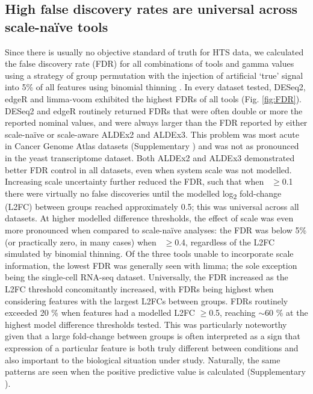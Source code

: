 \documentclass[10pt,letterpaper]{article}
\begin{document}
\subsection*{High false discovery rates are universal across scale-na\"ive tools}
Since there is usually no objective standard of truth for HTS data, we calculated the false discovery rate (FDR) for all combinations of tools and gamma values using a strategy of group permutation with the injection of artificial `true' signal into 5\% of all features using binomial thinning \cite{gerard_data-based_2020}. In every dataset tested, DESeq2, edgeR and limma-voom exhibited the highest FDRs of all tools (Fig. \ref{fig:FDR}). DESeq2 and edgeR routinely returned FDRs that were often double or more the reported nominal values, and were always larger than the FDR reported by either scale-na\"ive or scale-aware ALDEx2 and ALDEx3. This problem was most acute in Cancer Genome Atlas datasets (Supplementary ) and was not as pronounced in the yeast transcriptome dataset. Both ALDEx2 and ALDEx3 demonstrated better FDR control in all datasets, even when system scale was not modelled. Increasing scale uncertainty further reduced the FDR, such that when \textgamma~$\geq$0.1 there were virtually no false discoveries until the modelled log\textsubscript{2} fold-change (L2FC) between groups reached approximately 0.5; this was universal across all datasets. At higher modelled difference thresholds, the effect of scale was even more pronounced when compared to scale-na\"ive analyses: the FDR was below 5\% (or practically zero, in many cases) when \textgamma~$\geq$0.4, regardless of the L2FC simulated by binomial thinning. Of the three tools unable to incorporate scale information, the lowest FDR was generally seen with limma; the sole exception being the single-cell RNA-seq dataset. Universally, the FDR increased as the L2FC threshold concomitantly increased, with FDRs being highest when considering features with the largest L2FCs between groups. FDRs routinely exceeded 20 \% when features had a modelled L2FC $\geq$0.5, reaching $\sim$60 \% at the highest model difference thresholds tested. This was particularly noteworthy given that a large fold-change between groups is often interpreted as a sign that expression of a particular feature is both truly different between conditions and also important to the biological situation under study. Naturally, the same patterns are seen when the positive predictive value is calculated (Supplementary ).
\end{document}
